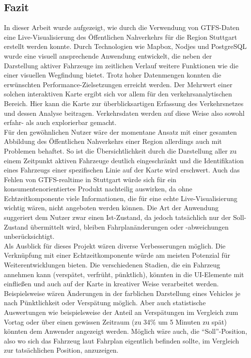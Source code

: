\begin{newpage}
  \section{Fazit}
  \label{sec:fazit}
    In dieser Arbeit wurde aufgezeigt, wie durch die Verwendung von GTFS-Daten eine Live-Visualisierung des Öffentlichen Nahverkehrs für die Region Stuttgart erstellt werden konnte. Durch Technologien wie Mapbox, Nodjes und PostgreSQL wurde eine visuell ansprechende Anwendung entwickelt, die neben der Darstellung aktiver Fahrzeuge im zeitlichen Verlauf weitere Funktionen wie die einer visuellen Wegfindung bietet. Trotz hoher Datenmengen konnten die erwünschten Performance-Zielsetzungen erreicht werden. Der Mehrwert einer solchen interaktiven Karte ergibt sich vor allem für den verkehrsanalytischen Bereich. Hier kann die Karte zur überblicksartigen Erfassung des Verkehrsnetzes und dessen Analyse beitragen. Verkehrsdaten werden auf diese Weise also sowohl erfahr- als auch explorierbar gemacht.\\

    Für den gewöhnlichen Nutzer wäre der momentane Ansatz mit einer gesamten Abbildung des Öffentlichen Nahverkehrs einer Region allerdings auch mit Problemen behaftet. So ist die Übersichtlichkeit durch die Darstellung aller zu einem Zeitpunkt aktiven Fahrzeuge deutlich eingeschränkt und die Identifikation eines Fahrzeugs einer spezifischen Linie auf der Karte wird erschwert. Auch das Fehlen von GTFS-realtime in Stuttgart würde sich für ein konsumentenorientiertes Produkt nachteilig auswirken, da ohne Echtzeitkomponente viele Informationen, die für eine echte Live-Visualisierung wichtig wären, nicht angeboten werden können. Die Art der Anwendung suggeriert dem Nutzer zwar einen Ist-Zustand, da jedoch tatsächlich nur der Soll-Zustand übermittelt wird, bleiben Fahrplanänderungen oder -abweichungen unberücksichtigt.\\

    Als Ausblick für dieses Projekt wären diverse Verbesserungen möglich. Die Verknüpfung mit einer Echtzeitkomponente würde am meisten Potenzial für Weiterentwicklungen bieten. Die verschiedenen Stadien, die ein Fahrzeug annehmen kann (verspätet, verfrüht, pünktlich), könnten in die UI-Elemente mit einfließen und auch auf der Karte in kreativer Weise verarbeitet werden. Beispielsweise wären Änderungen in der farblichen Darstellung eines Vehicles je nach Pünktlichkeit oder Verspätung möglich. Aber auch statistische Auswertungen wie beispielsweise der Anteil an Verspätungen im Vergleich zum Vortag oder über einen gewissen Zeitraum (zu 34\% um 5 Minuten zu spät) könnten dem Anwender angezeigt werden. Möglich wäre auch, die "`Soll"'-Position, also wo sich das Fahrzeug laut Fahrplan eigentlich befinden sollte, im Vergleich zur tatsächlichen Position, anzuzeigen.


\end{newpage}
